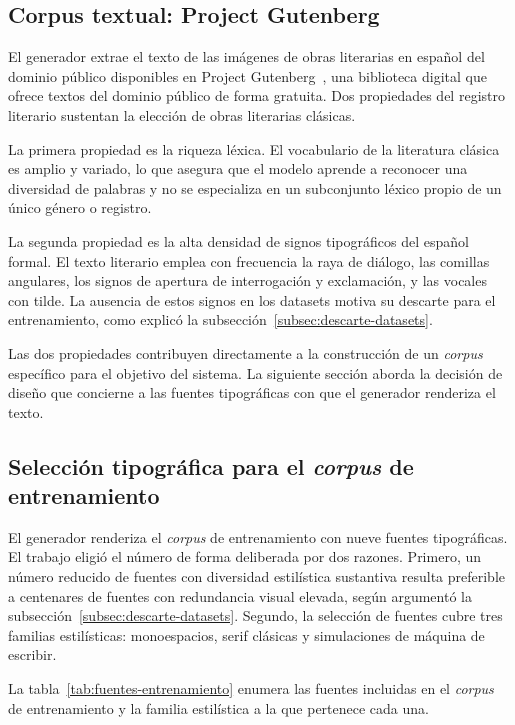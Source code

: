 \subsection{Corpus textual: Project Gutenberg}
\label{subsec:gutenberg}

El generador extrae el texto de las imágenes de obras literarias en español del dominio público disponibles en Project Gutenberg~\cite{gutenberg}, una biblioteca digital que ofrece textos del dominio público de forma gratuita. Dos propiedades del registro literario sustentan la elección de obras literarias clásicas.

La primera propiedad es la riqueza léxica. El vocabulario de la literatura clásica es amplio y variado, lo que asegura que el modelo aprende a reconocer una diversidad de palabras y no se especializa en un subconjunto léxico propio de un único género o registro.

La segunda propiedad es la alta densidad de signos tipográficos del español formal. El texto literario emplea con frecuencia la raya de diálogo, las comillas angulares, los signos de apertura de interrogación y exclamación, y las vocales con tilde. La ausencia de estos signos en los datasets motiva su descarte para el entrenamiento, como explicó la subsección~\ref{subsec:descarte-datasets}.

Las dos propiedades contribuyen directamente a la construcción de un \textit{corpus} específico para el objetivo del sistema. La siguiente sección aborda la decisión de diseño que concierne a las fuentes tipográficas con que el generador renderiza el texto.

\subsection{Selección tipográfica para el \textit{corpus} de entrenamiento}
\label{subsec:fuentes-entrenamiento}

El generador renderiza el \textit{corpus} de entrenamiento con nueve fuentes tipográficas. El trabajo eligió el número de forma deliberada por dos razones. Primero, un número reducido de fuentes con diversidad estilística sustantiva resulta preferible a centenares de fuentes con redundancia visual elevada, según argumentó la subsección~\ref{subsec:descarte-datasets}. Segundo, la selección de fuentes cubre tres familias estilísticas: monoespacios, serif clásicas y simulaciones de máquina de escribir.

La tabla~\ref{tab:fuentes-entrenamiento} enumera las fuentes incluidas en el \textit{corpus} de entrenamiento y la familia estilística a la que pertenece cada una.

